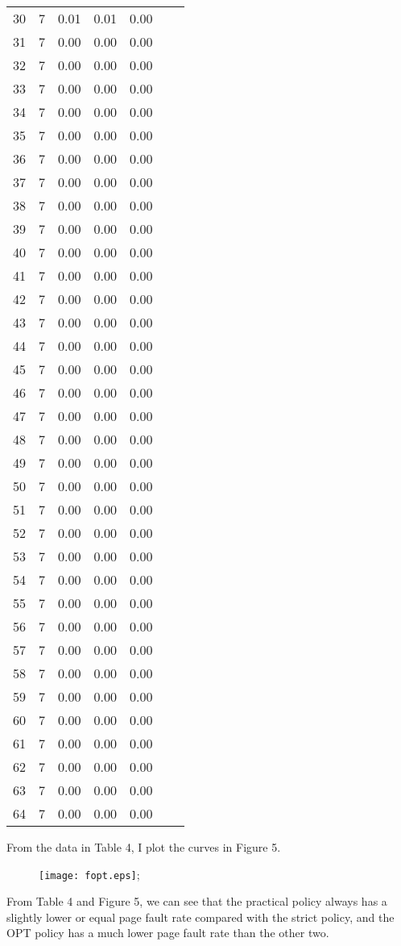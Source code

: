 \documentclass[12pt,letterpaper]{article}
\begin{document}
\begin{center}
\begin{longtable}{r|r|r|r|r|r|r}
30 & 7 & 0.01 & 0.01 & 0.00\\
31 & 7 & 0.00 & 0.00 & 0.00\\
32 & 7 & 0.00 & 0.00 & 0.00\\
33 & 7 & 0.00 & 0.00 & 0.00\\
34 & 7 & 0.00 & 0.00 & 0.00\\
35 & 7 & 0.00 & 0.00 & 0.00\\
36 & 7 & 0.00 & 0.00 & 0.00\\
37 & 7 & 0.00 & 0.00 & 0.00\\
38 & 7 & 0.00 & 0.00 & 0.00\\
39 & 7 & 0.00 & 0.00 & 0.00\\
40 & 7 & 0.00 & 0.00 & 0.00\\
41 & 7 & 0.00 & 0.00 & 0.00\\
42 & 7 & 0.00 & 0.00 & 0.00\\
43 & 7 & 0.00 & 0.00 & 0.00\\
44 & 7 & 0.00 & 0.00 & 0.00\\
45 & 7 & 0.00 & 0.00 & 0.00\\
46 & 7 & 0.00 & 0.00 & 0.00\\
47 & 7 & 0.00 & 0.00 & 0.00\\
48 & 7 & 0.00 & 0.00 & 0.00\\
49 & 7 & 0.00 & 0.00 & 0.00\\
50 & 7 & 0.00 & 0.00 & 0.00\\
51 & 7 & 0.00 & 0.00 & 0.00\\
52 & 7 & 0.00 & 0.00 & 0.00\\
53 & 7 & 0.00 & 0.00 & 0.00\\
54 & 7 & 0.00 & 0.00 & 0.00\\
55 & 7 & 0.00 & 0.00 & 0.00\\
56 & 7 & 0.00 & 0.00 & 0.00\\
57 & 7 & 0.00 & 0.00 & 0.00\\
58 & 7 & 0.00 & 0.00 & 0.00\\
59 & 7 & 0.00 & 0.00 & 0.00\\
60 & 7 & 0.00 & 0.00 & 0.00\\
61 & 7 & 0.00 & 0.00 & 0.00\\
62 & 7 & 0.00 & 0.00 & 0.00\\
63 & 7 & 0.00 & 0.00 & 0.00\\
64 & 7 & 0.00 & 0.00 & 0.00\\
\end{longtable}
\end{center}

From the data in Table 4, I plot the curves in Figure 5.

\begin{figure}
\begin{center}
\texttt{[image: fopt.eps]};
\end{center}
\end{figure}

From Table 4 and Figure 5, we can see that the practical policy always has a slightly lower or equal page fault rate compared with the strict policy, and the OPT policy has a much lower page fault rate than the other two.
\end{document}
